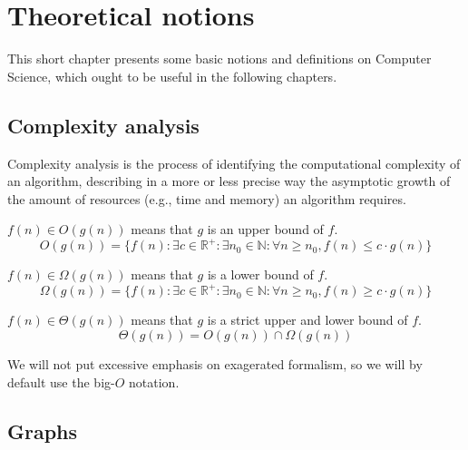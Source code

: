 \chapter{Theoretical notions}
This short chapter presents some basic notions and definitions on Computer Science, which ought to be useful in the following chapters.
\section{Complexity analysis}
Complexity analysis is the process of identifying the computational complexity of an algorithm, describing in a more or less precise way the asymptotic growth of the amount of resources (e.g., time and memory) an algorithm requires.
\begin{definition} $f(n) \in O(g(n))$ means that $g$ is an upper bound of $f$.
    \begin{equation*}
        O(g(n))=\{f(n) : \exists c \in \mathbb{R}^+ \colon \exists n_0 \in \mathbb{N} \colon \forall n \geq n_0, f(n) \leq c\cdot g(n)\}
    \end{equation*}
\end{definition}
\begin{definition} $f(n) \in \Omega(g(n))$ means that $g$ is a lower bound of $f$.
    \begin{equation*}
        \Omega(g(n))=\{f(n) : \exists c \in \mathbb{R}^+ \colon \exists n_0 \in \mathbb{N} \colon \forall n \geq n_0, f(n) \geq c\cdot g(n)\}
    \end{equation*}
\end{definition}
\begin{definition} $f(n) \in \Theta(g(n))$ means that $g$ is a strict upper and lower bound of $f$.
    \begin{equation*}
        \Theta(g(n))=O(g(n)) \cap \Omega(g(n))
    \end{equation*}
\end{definition}
We will not put excessive emphasis on exagerated formalism, so we will by default use the big-$O$ notation.
\section{Graphs}
